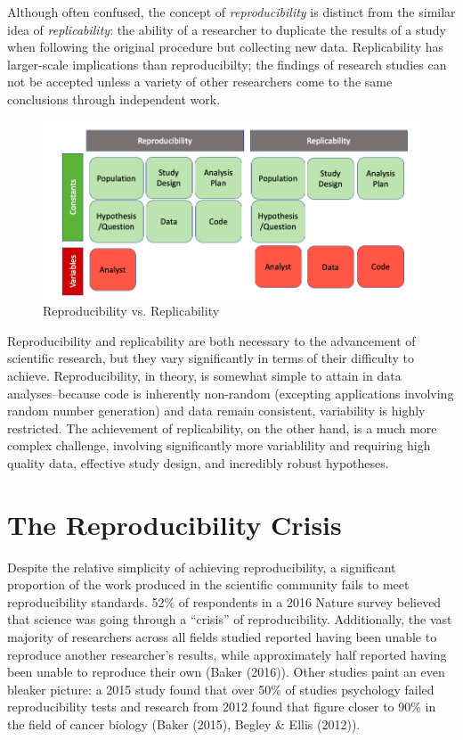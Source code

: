 \documentclass[12pt,twoside]{reedthesis}
\begin{document}
Although often confused, the concept of \emph{reproducibility} is
distinct from the similar idea of \emph{replicability}: the ability of a
researcher to duplicate the results of a study when following the
original procedure but collecting new data. Replicability has
larger-scale implications than reproducibilty; the findings of research
studies can not be accepted unless a variety of other researchers come
to the same conclusions through independent work.
\begin{figure}

{\centering \includegraphics[width=1\linewidth]{figure/versus} 

}

\caption{Reproducibility vs. Replicability}\label{fig:unnamed-chunk-3}
\end{figure}
Reproducibility and replicability are both necessary to the advancement
of scientific research, but they vary significantly in terms of their
difficulty to achieve. Reproducibility, in theory, is somewhat simple to
attain in data analyses--because code is inherently non-random
(excepting applications involving random number generation) and data
remain consistent, variability is highly restricted. The achievement of
replicability, on the other hand, is a much more complex challenge,
involving significantly more variablility and requiring high quality
data, effective study design, and incredibly robust hypotheses.

\section{The Reproducibility Crisis}\label{the-reproducibility-crisis}

Despite the relative simplicity of achieving reproducibility, a
significant proportion of the work produced in the scientific community
fails to meet reproducibility standards. 52\% of respondents in a 2016
Nature survey believed that science was going through a ``crisis'' of
reproducibility. Additionally, the vast majority of researchers across
all fields studied reported having been unable to reproduce another
researcher's results, while approximately half reported having been
unable to reproduce their own (Baker (2016)). Other studies paint an
even bleaker picture: a 2015 study found that over 50\% of studies
psychology failed reproducibility tests and research from 2012 found
that figure closer to 90\% in the field of cancer biology (Baker (2015),
Begley \& Ellis (2012)).
\end{document}
